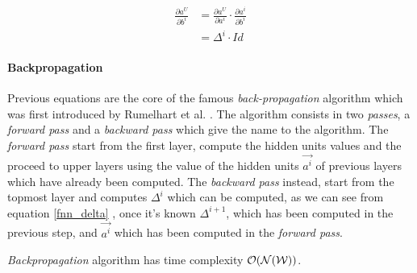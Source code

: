 \begin{align}
\frac{\partial a^U}{\partial b^i} &= \frac{\partial a^U}{\partial a^i} \cdot \frac{\partial a^i}{\partial b^i}\\
&= \Delta^{i} \cdot Id
\end{align}


\paragraph{Backpropagation}

Previous equations are the core of the famous \textit{back-propagation} algorithm which was first introduced by Rumelhart et al. \cite{Rumelhart86}.
The algorithm consists in two \textit{passes}, a \textit{forward pass} and a \textit{backward pass} which give the name to the algorithm.
The \textit{forward pass} start from the first layer, compute the hidden units values and the proceed to upper layers using the value of the hidden units 
$\vec{a^i}$ of previous layers which have already been computed. The \textit{backward pass} instead, start from the topmost layer and computes $\Delta^{i}$
which can be computed, as we can see from equation \ref{fnn_delta} , once it's known $\Delta^{i+1}$, which has been computed in the previous step, and $\vec{a^i}$ which
has been computed in the \textit{forward pass}.

\textit{Backpropagation} algorithm has time complexity $\mathcal{O}(\mathcal{N}(\mathcal{W}))$.

